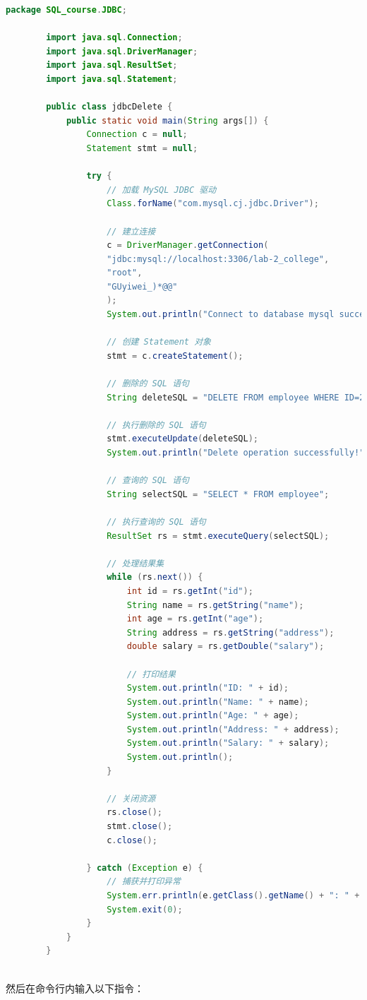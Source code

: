 \documentclass{article}
\begin{document}
	\begin{lstlisting}[language=java, title=jdbcDelete, tabsize=4]
		package SQL_course.JDBC;
		
		import java.sql.Connection;
		import java.sql.DriverManager;
		import java.sql.ResultSet;
		import java.sql.Statement;
		
		public class jdbcDelete {
			public static void main(String args[]) {
				Connection c = null;
				Statement stmt = null;
				
				try {
					// 加载 MySQL JDBC 驱动
					Class.forName("com.mysql.cj.jdbc.Driver");
					
					// 建立连接
					c = DriverManager.getConnection(
					"jdbc:mysql://localhost:3306/lab-2_college",
					"root",
					"GUyiwei_)*@@"
					);
					System.out.println("Connect to database mysql successfully!");
					
					// 创建 Statement 对象
					stmt = c.createStatement();
					
					// 删除的 SQL 语句
					String deleteSQL = "DELETE FROM employee WHERE ID=2";
					
					// 执行删除的 SQL 语句
					stmt.executeUpdate(deleteSQL);
					System.out.println("Delete operation successfully!");
					
					// 查询的 SQL 语句
					String selectSQL = "SELECT * FROM employee";
					
					// 执行查询的 SQL 语句
					ResultSet rs = stmt.executeQuery(selectSQL);
					
					// 处理结果集
					while (rs.next()) {
						int id = rs.getInt("id");
						String name = rs.getString("name");
						int age = rs.getInt("age");
						String address = rs.getString("address");
						double salary = rs.getDouble("salary");
						
						// 打印结果
						System.out.println("ID: " + id);
						System.out.println("Name: " + name);
						System.out.println("Age: " + age);
						System.out.println("Address: " + address);
						System.out.println("Salary: " + salary);
						System.out.println();
					}
					
					// 关闭资源
					rs.close();
					stmt.close();
					c.close();
					
				} catch (Exception e) {
					// 捕获并打印异常
					System.err.println(e.getClass().getName() + ": " + e.getMessage());
					System.exit(0);
				}
			}
		}
		
	\end{lstlisting}
	
	然后在命令行内输入以下指令：
	
\end{document}
